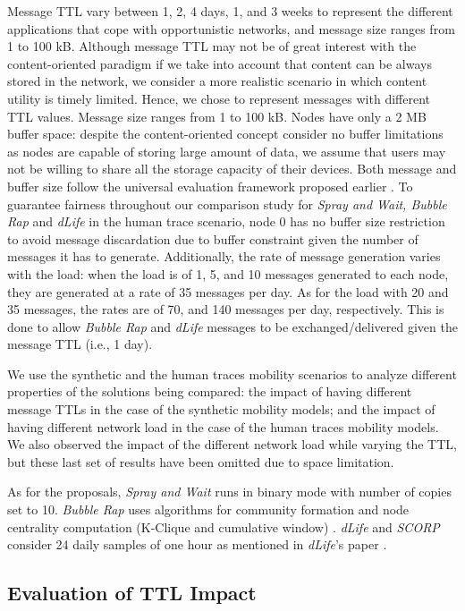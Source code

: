 \documentclass[lnicst]{svmultln}
\begin{document}
Message TTL vary between 1, 2, 4 days, 1, and 3 weeks to represent
the different applications that cope with opportunistic networks,
and message size ranges from 1 to 100 kB. Although message TTL may
not be of great interest with the content-oriented paradigm if we
take into account that content can be always stored in the network,
we consider a more realistic scenario in which content utility is
timely limited. Hence, we chose to represent messages with different
TTL values. Message size ranges from 1 to 100 kB. Nodes have only
a 2 MB buffer space: despite the content-oriented concept consider
no buffer limitations as nodes are capable of storing large amount
of data, we assume that users may not be willing to share all the
storage capacity of their devices. Both message and buffer size follow
the universal evaluation framework proposed earlier \cite{latincom}.
To guarantee fairness throughout our comparison study for \emph{Spray
and Wait, Bubble Rap }and\emph{ dLife} in the human trace scenario,
node 0 has no buffer size restriction to avoid message discardation
due to buffer constraint given the number of messages it has to generate.
Additionally, the rate of message generation varies with the load:
when the load is of 1, 5, and 10 messages generated to each node,
they are generated at a rate of 35 messages per day. As for the load
with 20 and 35 messages, the rates are of 70, and 140 messages per
day, respectively. This is done to allow \emph{Bubble Rap} and \emph{dLife
}messages to be exchanged/delivered given the message TTL (i.e., 1
day).

We use the synthetic and the human traces mobility scenarios to analyze
different properties of the solutions being compared: the impact of
having different message TTLs in the case of the synthetic mobility
models; and the impact of having different network load in the case
of the human traces mobility models. We also observed the impact of
the different network load while varying the TTL, but these last set
of results have been omitted due to space limitation.

As for the proposals, \emph{Spray and Wait} runs in binary mode with
number of copies  set to 10. \emph{Bubble Rap} uses algorithms
for community formation and node centrality computation (K-Clique
and cumulative window) \cite{bubble2011}. \emph{dLife }and \emph{SCORP}
consider 24 daily samples of one hour as mentioned in \emph{dLife}'s
paper \cite{dlife}.


\subsection{Evaluation of TTL Impact \label{sub:TTL-Impact-Evaluation}}
\end{document}
